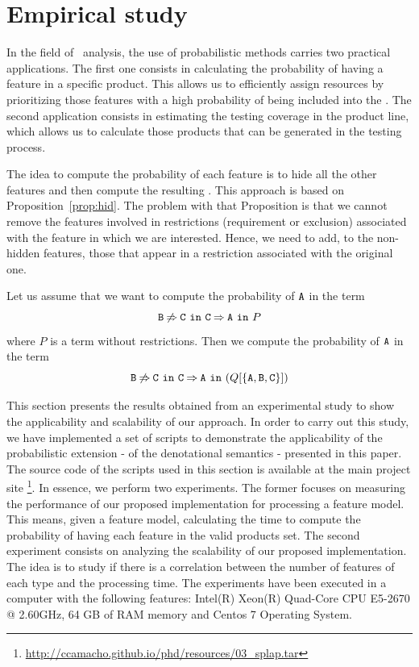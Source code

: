 
\section{Empirical study}
\label{sec:stat:impl}


In the field of \SPLs\ analysis, the use of probabilistic methods carries two practical applications.
The first one consists in calculating the probability of having a
feature in a specific product.
This allows us to efficiently assign resources by prioritizing those features with a high probability
of being included into the \SPL. The second application consists in estimating the testing coverage
in the product line, which allows us to calculate those products that can be generated in the testing process.

The idea to compute the probability of each feature is to hide all the
other features and then compute the resulting \SPL. This approach is
based on Proposition~\ref{prop:hid}. The problem with that Proposition
is that we cannot remove the features involved in restrictions
(requirement or exclusion) associated with the feature in which we are
interested. Hence, we need to add, to the non-hidden features, those that
appear in a restriction associated with the original one.
\begin{example}
  Let us assume that we want to compute the probability of ${\mathtt{A}}$ in
  the term
  \begin{displaymath}
    \mathtt{B}\mathbin{\not\Rightarrow}\mathtt{C}\ \mathtt{in}\ \mathtt{C}\mathbin{\Rightarrow}\mathtt{A}\ \mathtt{in}\ P
    \end{displaymath}
    where \(P\) is a term without restrictions. Then we compute the
    probability of ${\mathtt{A}}$ in the term
  \begin{displaymath}
    \mathtt{B}\mathbin{\not\Rightarrow}\mathtt{C}\ \mathtt{in}\ \mathtt{C}\mathbin{\Rightarrow}\mathtt{A}\ \mathtt{in}\ (Q[\{{\mathtt{A}}, {\mathtt{B}}, {\mathtt{C}}\}])
    \end{displaymath}

\end{example}

This section presents the results obtained from an experimental study to show the applicability and scalability of our
approach. In order to carry out this study, we have implemented a set of scripts to demonstrate
the applicability of the
probabilistic extension - of the denotational semantics - presented in this paper. The source code of the
scripts used in this section is available at the main project site
\footnote{\url{http://ccamacho.github.io/phd/resources/03_splap.tar}}. In essence, we perform two experiments.
The former focuses on measuring the performance of our proposed implementation for processing a feature model.
This means, given a feature model, calculating the time to
compute the probability of having each feature in the
valid products set.
The second experiment consists on analyzing the scalability of our proposed implementation.
The idea is to study if there is a correlation between the number of features of each type and the
processing time. The experiments have been executed in a computer with the following features: Intel(R)
Xeon(R) Quad-Core CPU E5-2670 @ 2.60GHz, 64 GB of RAM memory and Centos 7 Operating System.

